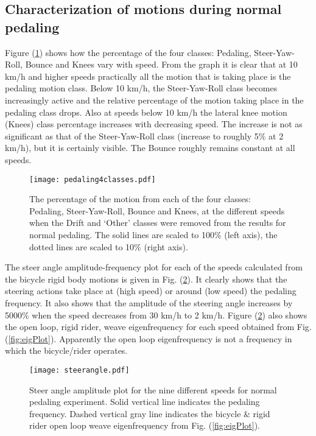 \subsection{Characterization of motions during normal pedaling}
\label{sec:normalPed}
Figure (\ref{jellybean}) shows how the percentage of the four classes: Pedaling, Steer-Yaw-Roll, Bounce and Knees vary with speed. From the graph it is clear that at 10 km/h and higher speeds practically all the motion that is taking place is the pedaling motion class. Below 10 km/h, the Steer-Yaw-Roll class becomes increasingly active and the relative percentage of the motion taking place in the pedaling class drops. Also at speeds below 10 km/h the lateral knee motion (Knees) class percentage increases with decreasing speed. The increase is not as significant as that of the Steer-Yaw-Roll class (increase to roughly 5\% at 2 km/h), but it is certainly visible. The Bounce roughly remains constant at all speeds.
\begin{figure}[]
    \centering
    \texttt{[image: pedaling4classes.pdf]}
    \caption{The percentage of the motion from each of the four classes: Pedaling, Steer-Yaw-Roll, Bounce and Knees, at the different speeds when the Drift and `Other' classes were removed from the results for normal pedaling. The solid lines are scaled to 100\% (left axis), the dotted lines are scaled to 10\% (right axis).}
    \label{jellybean}
\end{figure}

The steer angle amplitude-frequency plot for each of the speeds calculated from the bicycle rigid body motions is given in Fig. (\ref{pedalsteerangle}). It clearly shows that the steering actions take place at (high speed) or around (low speed) the pedaling frequency. It also shows that the amplitude of the steering angle increases by 5000\% when the speed decreases from 30 km/h to 2 km/h. Figure (\ref{pedalsteerangle}) also shows the open loop, rigid rider, weave eigenfrequency for each speed obtained from Fig. (\ref{fig:eigPlot}). Apparently the open loop eigenfrequency is not a frequency in which the bicycle/rider operates.
\begin{figure}[tb]
    \centering
        \texttt{[image: steerangle.pdf]}\\
    \caption{Steer angle amplitude plot for the nine different speeds for normal pedaling experiment. Solid vertical line indicates the pedaling frequency. Dashed vertical gray line indicates the bicycle \& rigid rider open loop weave eigenfrequency from Fig. (\ref{fig:eigPlot}).}
    \label{pedalsteerangle}
\end{figure}
